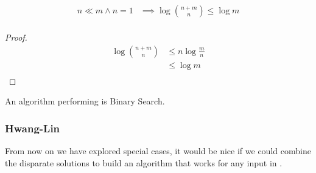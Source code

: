 \begin{lemma}
\begin{align*}
n \ll m \land n = 1 &\implies \log\binom{n+m}{n} \leq \log m\\
\end{align*}
\end{lemma}

\begin{proof}
\begin{align*}
\log\binom{n+m}{n} &\leq n \log\frac{m}{n}\\
&\leq \log m\\
\end{align*}
\end{proof}

An algorithm performing  is Binary Search.

\subsubsection{Hwang-Lin}

From now on we have explored special cases, it would be nice if we could combine the disparate solutions to build an algorithm that works for any input in .